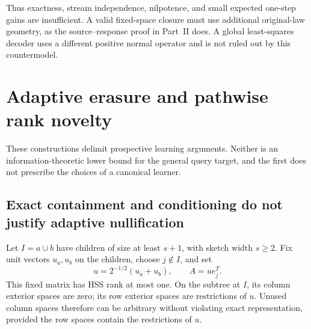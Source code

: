 \documentclass[11pt,oneside,openany,a4paper]{book}
\numberwithin{equation}{chapter}
\theoremstyle{definition}
\theoremstyle{remark}
\newcommand{\proofstep}[1]{\par\addvspace{.45\baselineskip}\Needspace{3\baselineskip}\textbf{#1}\par\nobreak}
\newcommand{\R}{\mathbb R}\newcommand{\E}{\mathbb E}\newcommand{\Prb}{\mathbb P}\newcommand{\PP}{\mathbb P}
\newcommand{\T}{\mathsf T}\newcommand{\Id}{I}
\newcommand{\F}[1]{\left\lVert#1\right\rVert_F}
\newcommand{\N}[1]{\left\lVert#1\right\rVert}
\newcommand{\op}[1]{\left\lVert#1\right\rVert_{\rm op}}
\newcommand{\ip}[2]{\left\langle#1,#2\right\rangle_F}
\DeclareMathOperator{\tr}{tr}\DeclareMathOperator{\rank}{rank}
\DeclareMathOperator{\diag}{blockdiag}\DeclareMathOperator{\range}{range}
\DeclareMathOperator{\HSS}{HSS}\DeclareMathOperator{\dist}{dist}
\DeclareMathOperator{\Var}{Var}\DeclareMathOperator{\supp}{supp}
\newcommand{\UC}{\mathcal U}\newcommand{\VC}{\mathcal V}\newcommand{\err}{\mathcal E}
\newcommand{\Sn}[2]{\left\lVert#1\right\rVert_{S_{#2}}}
\newcommand{\Cov}{\mathsf C}\newcommand{\Loss}{\mathsf L}\newcommand{\Fil}{\mathcal F}
\DeclareMathOperator{\diver}{div}\DeclareMathOperator{\vecop}{vec}\DeclareMathOperator{\Gammafun}{Gamma}
\begin{document}
Thus exactness, stream independence, nilpotence, and small expected one-step gains are insufficient. A valid fixed-space closure must use additional original-law geometry, as the source--response proof in Part~II does. A global least-squares decoder uses a different positive normal operator and is not ruled out by this countermodel.

\endgroup

\begingroup
\let\R\relax
\newcommand{\R}{\mathbb R}
\let\E\relax
\newcommand{\E}{\mathbb E}
\let\Prb\relax
\newcommand{\Prb}{\mathbb P}
\let\T\relax
\newcommand{\T}{\mathsf T}
\let\F\relax
\newcommand{\F}[1]{\left\lVert#1\right\rVert_{F}}
\let\N\relax
\newcommand{\N}[1]{\left\lVert#1\right\rVert}
\let\ip\relax
\newcommand{\ip}[2]{\left\langle#1,#2\right\rangle_F}
\let\tr\relax
\newcommand{\tr}{\operatorname{tr}}
\let\rank\relax
\newcommand{\rank}{\operatorname{rank}}
\let\diag\relax
\newcommand{\diag}{\operatorname{blockdiag}}
\let\range\relax
\newcommand{\range}{\operatorname{range}}
\let\OPT\relax
\newcommand{\OPT}{\operatorname{OPT}}
\let\HSS\relax
\newcommand{\HSS}{\operatorname{HSS}}
\let\diver\relax
\newcommand{\diver}{\operatorname{div}}
\let\Var\relax
\newcommand{\Var}{\operatorname{Var}}
\let\UC\relax
\newcommand{\UC}{\mathcal U}
\let\VC\relax
\newcommand{\VC}{\mathcal V}
\let\err\relax
\newcommand{\err}{\mathcal E}
\let\proofstep\relax
\newcommand{\proofstep}[1]{\par\addvspace{.45\baselineskip}\Needspace{3\baselineskip}\textbf{#1}\par\nobreak}
\let\op\relax
\newcommand{\op}[1]{\left\lVert#1\right\rVert_{\mathrm{op}}}
\let\Sn\relax
\newcommand{\Sn}[2]{\left\lVert#1\right\rVert_{S_{#2}}}
\let\Cov\relax
\newcommand{\Cov}{\mathsf C}
\let\Loss\relax
\newcommand{\Loss}{\mathsf L}
\let\Fil\relax
\newcommand{\Fil}{\mathcal F}
\let\Id\relax
\newcommand{\Id}{I}
\let\supp\relax
\newcommand{\supp}{\operatorname{supp}}
\let\vecop\relax
\newcommand{\vecop}{\operatorname{vec}}
\let\Gammafun\relax
\newcommand{\Gammafun}{\operatorname{Gamma}}
\chapter{Adaptive erasure and pathwise rank novelty}\label{ch:basisobs}
These constructions delimit prospective learning arguments. Neither is an information-theoretic lower bound for the general query target, and the first does not prescribe the choices of a canonical learner.

\section{Exact containment and conditioning do not justify adaptive nullification}
Let $I=a\cup b$ have children of size at least $s+1$, with sketch width $s\ge2$. Fix unit vectors $u_a,u_b$ on the children, choose $j\notin I$, and set
\[
 u=2^{-1/2}(u_a+u_b),\qquad A=ue_j^T.
\]
This fixed matrix has HSS rank at most one. On the subtree at $I$, its column exterior spaces are zero; its row exterior spaces are restrictions of $u$. Unused column spaces therefore can be arbitrary without violating exact representation, provided the row spaces contain the restrictions of $u$.
\end{document}
